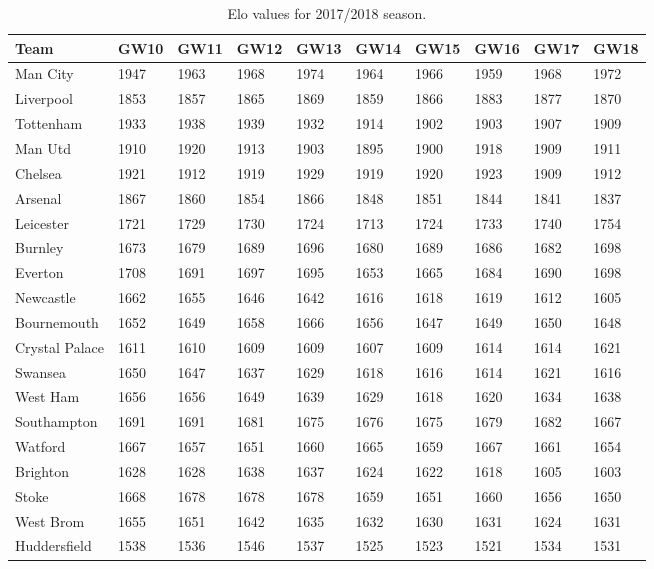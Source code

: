 \begin{table}[H]
\centering
\smaller
\caption{Elo values for 2017/2018 season.}
\label{my-label}
\begin{tabular}{|l|l|l|l|l|l|l|l|l|l|}
\hline
Team           & GW10 & GW11 & GW12 & GW13 & GW14 & GW15 & GW16 & GW17 & GW18 \\
\hline
Man City       & 1947 & 1963 & 1968 & 1974 & 1964 & 1966 & 1959 & 1968 & 1972 \\
Liverpool      & 1853 & 1857 & 1865 & 1869 & 1859 & 1866 & 1883 & 1877 & 1870 \\
Tottenham      & 1933 & 1938 & 1939 & 1932 & 1914 & 1902 & 1903 & 1907 & 1909 \\
Man Utd        & 1910 & 1920 & 1913 & 1903 & 1895 & 1900 & 1918 & 1909 & 1911 \\
Chelsea        & 1921 & 1912 & 1919 & 1929 & 1919 & 1920 & 1923 & 1909 & 1912 \\
Arsenal        & 1867 & 1860 & 1854 & 1866 & 1848 & 1851 & 1844 & 1841 & 1837 \\
Leicester      & 1721 & 1729 & 1730 & 1724 & 1713 & 1724 & 1733 & 1740 & 1754 \\
Burnley        & 1673 & 1679 & 1689 & 1696 & 1680 & 1689 & 1686 & 1682 & 1698 \\
Everton        & 1708 & 1691 & 1697 & 1695 & 1653 & 1665 & 1684 & 1690 & 1698 \\
Newcastle      & 1662 & 1655 & 1646 & 1642 & 1616 & 1618 & 1619 & 1612 & 1605 \\
Bournemouth    & 1652 & 1649 & 1658 & 1666 & 1656 & 1647 & 1649 & 1650 & 1648 \\
Crystal Palace & 1611 & 1610 & 1609 & 1609 & 1607 & 1609 & 1614 & 1614 & 1621 \\
Swansea        & 1650 & 1647 & 1637 & 1629 & 1618 & 1616 & 1614 & 1621 & 1616 \\
West Ham       & 1656 & 1656 & 1649 & 1639 & 1629 & 1618 & 1620 & 1634 & 1638 \\
Southampton    & 1691 & 1691 & 1681 & 1675 & 1676 & 1675 & 1679 & 1682 & 1667 \\
Watford        & 1667 & 1657 & 1651 & 1660 & 1665 & 1659 & 1667 & 1661 & 1654 \\
Brighton       & 1628 & 1628 & 1638 & 1637 & 1624 & 1622 & 1618 & 1605 & 1603 \\
Stoke          & 1668 & 1678 & 1678 & 1678 & 1659 & 1651 & 1660 & 1656 & 1650 \\
West Brom      & 1655 & 1651 & 1642 & 1635 & 1632 & 1630 & 1631 & 1624 & 1631 \\
Huddersfield   & 1538 & 1536 & 1546 & 1537 & 1525 & 1523 & 1521 & 1534 & 1531 \\
\hline
\end{tabular}
\end{table}


